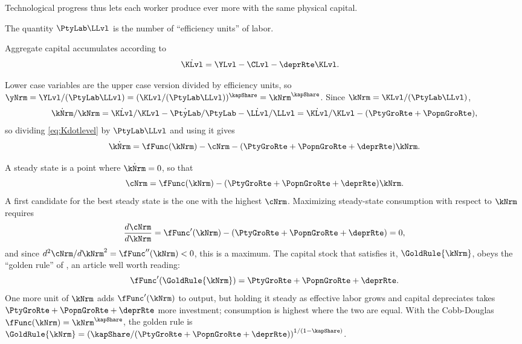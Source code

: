 \documentclass{econark}
\begin{document}
Technological progress thus lets each worker produce ever more with the same physical capital.

The quantity $\PtyLab \LLvl$ is the number of ``efficiency units'' of labor.

Aggregate capital accumulates according to
\begin{equation}\begin{gathered}\begin{aligned}
  \dot{\KLvl} & =  \YLvl - \CLvl - \deprRte \KLvl \label{eq:Kdotlevel}.
\end{aligned}\end{gathered}\end{equation}

Lower case variables are the upper case version divided by efficiency units, so $\yNrm = \YLvl/(\PtyLab \LLvl) = (\KLvl/(\PtyLab \LLvl))^{\kapShare} = \kNrm^{\kapShare}$. Since $\kNrm = \KLvl/(\PtyLab \LLvl)$,
\begin{equation}
  \dot{\kNrm}/\kNrm = \dot{\KLvl}/\KLvl - \dot{\PtyLab}/\PtyLab - \dot{\LLvl}/\LLvl = \dot{\KLvl}/\KLvl - (\PtyGroRte +\PopnGroRte),
\end{equation}
so dividing \eqref{eq:Kdotlevel} by $\PtyLab \LLvl$ and using it gives
\begin{equation}
  \dot{\kNrm} = \fFunc(\kNrm) - \cNrm - (\PtyGroRte +\PopnGroRte+\deprRte) \kNrm . \label{eq:RCK-kdot}
\end{equation}

A steady state is a point where $\dot{\kNrm} = 0$, so that
\begin{equation}
  \cNrm = \fFunc(\kNrm) - (\PtyGroRte +\PopnGroRte+\deprRte) \kNrm . \label{eq:RCK-cSteadyState}
\end{equation}
A first candidate for the best steady state is the one with the highest $\cNrm$. Maximizing steady-state consumption with respect to $\kNrm$ requires
\begin{equation*}
  \frac{d\cNrm}{d\kNrm} = \fFunc^{\prime}(\kNrm) - (\PtyGroRte +\PopnGroRte+\deprRte) = 0 ,
\end{equation*}
and since $d^{2}\cNrm/d\kNrm^{2} = \fFunc^{\prime\prime}(\kNrm) < 0$, this is a maximum. The capital stock that satisfies it, $\GoldRule{\kNrm}$, obeys the ``golden rule'' of \citet{phelps:golden}, an article well worth reading:
\begin{equation}
  \fFunc^{\prime}(\GoldRule{\kNrm}) = \PtyGroRte +\PopnGroRte+\deprRte . \label{eq:RCK-goldenRule}
\end{equation}
One more unit of $\kNrm$ adds $\fFunc^{\prime}(\kNrm)$ to output, but holding it steady as effective labor grows and capital depreciates takes $\PtyGroRte +\PopnGroRte+\deprRte$ more investment; consumption is highest where the two are equal. With the Cobb-Douglas $\fFunc(\kNrm) = \kNrm^{\kapShare}$, the golden rule is $\GoldRule{\kNrm} = \left(\kapShare/(\PtyGroRte +\PopnGroRte+\deprRte)\right)^{1/(1-\kapShare)}$.
\end{document}
